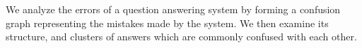 We analyze the errors of a question answering system by forming a confusion graph representing the mistakes made by the system. We then examine its structure, and clusters of answers which are commonly confused with each other.
